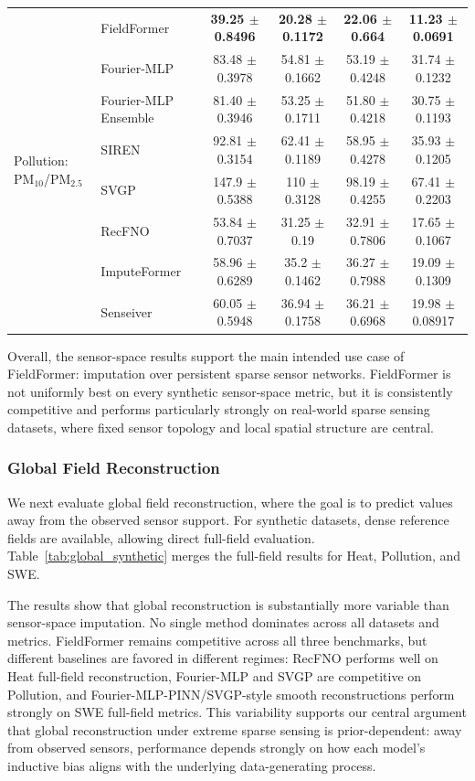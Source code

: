 \begin{table}[htbp]
{\begin{tabular}{llcccc}
\multirow{8}{*}{Pollution: PM$_{10}$/PM$_{2.5}$}
& FieldFormer & \textbf{39.25 $\pm$ 0.8496} & \textbf{20.28 $\pm$ 0.1172} & \textbf{22.06 $\pm$ 0.664} & \textbf{11.23 $\pm$ 0.0691} \\
& Fourier-MLP & 83.48 $\pm$ 0.3978 & 54.81 $\pm$ 0.1662 & 53.19 $\pm$ 0.4248 & 31.74 $\pm$ 0.1232 \\
& Fourier-MLP Ensemble & 81.40 $\pm$ 0.3946 & 53.25 $\pm$ 0.1711 & 51.80 $\pm$ 0.4218 & 30.75 $\pm$ 0.1193 \\
& SIREN & 92.81 $\pm$ 0.3154 & 62.41 $\pm$ 0.1189 & 58.95 $\pm$ 0.4278 & 35.93 $\pm$ 0.1205 \\
& SVGP & 147.9 $\pm$ 0.5388 & 110 $\pm$ 0.3128 & 98.19 $\pm$ 0.4255 & 67.41 $\pm$ 0.2203 \\
& RecFNO & 53.84 $\pm$ 0.7037 & 31.25 $\pm$ 0.19 & 32.91 $\pm$ 0.7806 & 17.65 $\pm$ 0.1067 \\
& ImputeFormer & 58.96 $\pm$ 0.6289 & 35.2 $\pm$ 0.1462 & 36.27 $\pm$ 0.7988 & 19.09 $\pm$ 0.1309 \\
& Senseiver & 60.05 $\pm$ 0.5948 & 36.94 $\pm$ 0.1758 & 36.21 $\pm$ 0.6968 & 19.98 $\pm$ 0.08917 \\

\hline
\end{tabular}%
}
\end{table}

Overall, the sensor-space results support the main intended use case of FieldFormer: imputation over persistent sparse sensor networks. FieldFormer is not uniformly best on every synthetic sensor-space metric, but it is consistently competitive and performs particularly strongly on real-world sparse sensing datasets, where fixed sensor topology and local spatial structure are central.

\subsubsection{Global Field Reconstruction}
\label{sec:global_reconstruction_results}

We next evaluate global field reconstruction, where the goal is to predict values away from the observed sensor support. For synthetic datasets, dense reference fields are available, allowing direct full-field evaluation. Table~\ref{tab:global_synthetic} merges the full-field results for Heat, Pollution, and SWE.

The results show that global reconstruction is substantially more variable than sensor-space imputation. No single method dominates across all datasets and metrics. FieldFormer remains competitive across all three benchmarks, but different baselines are favored in different regimes: RecFNO performs well on Heat full-field reconstruction, Fourier-MLP and SVGP are competitive on Pollution, and Fourier-MLP-PINN/SVGP-style smooth reconstructions perform strongly on SWE full-field metrics. This variability supports our central argument that global reconstruction under extreme sparse sensing is prior-dependent: away from observed sensors, performance depends strongly on how each model's inductive bias aligns with the underlying data-generating process.

